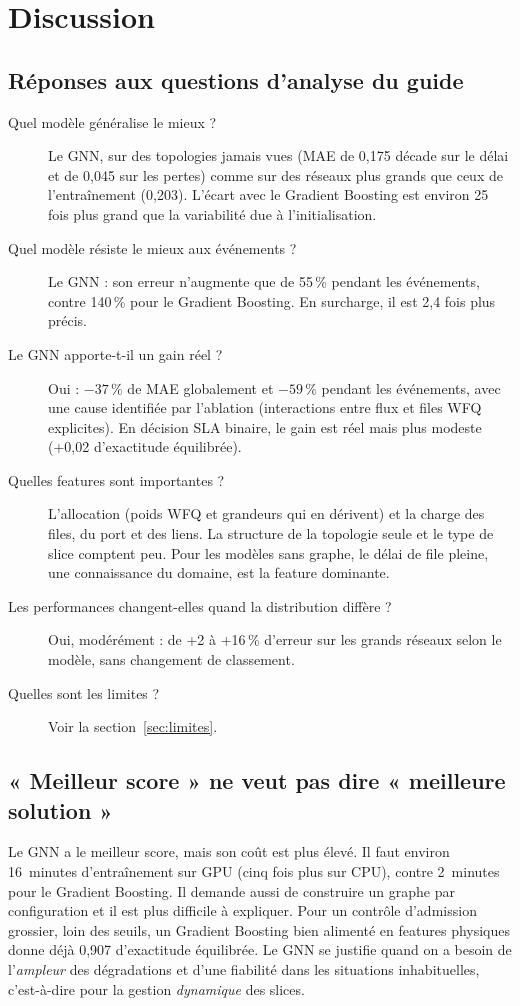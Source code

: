 \chapter{Discussion}\label{chap:disc}
\section{Réponses aux questions d'analyse du guide}
\begin{description}
  \item[Quel modèle généralise le mieux ?] Le GNN, sur des topologies jamais vues (MAE de 0,175 décade sur le délai et de 0,045 sur les pertes) comme sur des réseaux plus grands que ceux de l'entraînement (0,203). L'écart avec le Gradient Boosting est environ 25 fois plus grand que la variabilité due à l'initialisation.
  \item[Quel modèle résiste le mieux aux événements ?] Le GNN : son erreur n'augmente que de 55\,\% pendant les événements, contre 140\,\% pour le Gradient Boosting. En surcharge, il est 2,4 fois plus précis.
  \item[Le GNN apporte-t-il un gain réel ?] Oui : $-37\,\%$ de MAE globalement et $-59\,\%$ pendant les événements, avec une cause identifiée par l'ablation (interactions entre flux et files WFQ explicites). En décision SLA binaire, le gain est réel mais plus modeste (+0,02 d'exactitude équilibrée).
  \item[Quelles features sont importantes ?] L'allocation (poids WFQ et grandeurs qui en dérivent) et la charge des files, du port et des liens. La structure de la topologie seule et le type de slice comptent peu. Pour les modèles sans graphe, le délai de file pleine, une connaissance du domaine, est la feature dominante.
  \item[Les performances changent-elles quand la distribution diffère ?] Oui, modérément : de +2 à +16\,\% d'erreur sur les grands réseaux selon le modèle, sans changement de classement.
  \item[Quelles sont les limites ?] Voir la section~\ref{sec:limites}.
\end{description}

\section{« Meilleur score » ne veut pas dire « meilleure solution »}
Le GNN a le meilleur score, mais son coût est plus élevé. Il faut environ 16~minutes d'entraînement sur GPU (cinq fois plus sur CPU), contre 2~minutes pour le Gradient Boosting. Il demande aussi de construire un graphe par configuration et il est plus difficile à expliquer. Pour un contrôle d'admission grossier, loin des seuils, un Gradient Boosting bien alimenté en features physiques donne déjà 0,907 d'exactitude équilibrée. Le GNN se justifie quand on a besoin de l'\emph{ampleur} des dégradations et d'une fiabilité dans les situations inhabituelles, c'est-à-dire pour la gestion \emph{dynamique} des slices.

